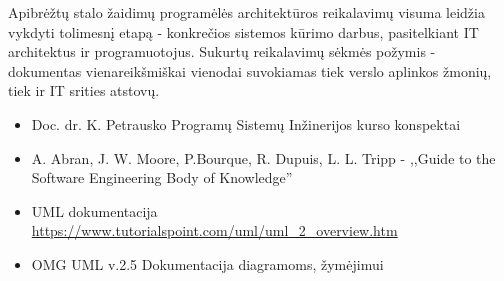 \documentclass{VUMIFPSkursinis}
\begin{document}
Apibrėžtų stalo žaidimų programėlės architektūros reikalavimų visuma leidžia vykdyti tolimesnį etapą - konkrečios sistemos kūrimo darbus, pasitelkiant IT architektus ir programuotojus. Sukurtų reikalavimų sėkmės požymis - dokumentas vienareikšmiškai vienodai suvokiamas tiek verslo aplinkos žmonių, tiek ir IT srities atstovų.

\begin{itemize}
	\item Doc. dr. K. Petrausko Programų Sistemų Inžinerijos kurso konspektai
    \item A. Abran, J. W. Moore, P.Bourque, R. Dupuis, L. L. Tripp - ,,Guide to the Software Engineering Body of Knowledge''
	\item UML dokumentacija \url{https://www.tutorialspoint.com/uml/uml_2_overview.htm}
	\item OMG UML v.2.5 Dokumentacija diagramoms, žymėjimui
\end{itemize}
\end{document}
